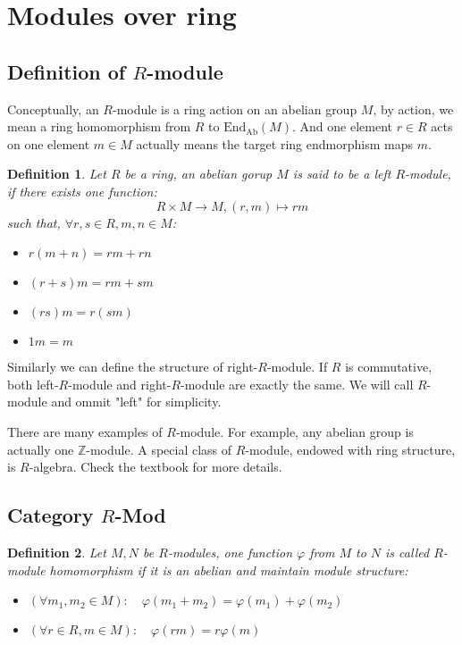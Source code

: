 \documentclass[a4paper, pdf, 11.5pt]{article}
\newtheorem{definition}{Definition}
\begin{document}
\section{Modules over ring}
\subsection{Definition of $R$-module}
Conceptually, an $R$-module is a ring action on an abelian group $M$, by action, we mean
a ring homomorphism from $R$ to $\mbox{End}_{\mbox{Ab}}(M)$. And one element $r\in R$ acts 
on one element $m\in M$ actually means the target ring endmorphism maps $m$.

\begin{definition}
  Let $R$ be a ring, an abelian gorup $M$ is said to be a left $R$-module, if there exists 
  one function:
  $$
  R\times M\rightarrow M, (r, m)\mapsto rm
  $$  such that, $\forall r, s\in R, m,n\in M$:
  \begin{itemize}[leftmargin=0.7cm]
    \item $r(m+n) = rm+rn$
    \item $(r+s)m = rm + sm$
    \item $(rs)m = r(sm)$
    \item $1m = m$
  \end{itemize}
\end{definition}

Similarly we can define the structure of right-$R$-module. If $R$ is commutative, both left-$R$-module
and right-$R$-module are exactly the same. We will call $R$-module and ommit "left" for simplicity.

There are many examples of $R$-module. For example, any abelian group is actually one $\mathbb{Z}$-module. 
A special class of $R$-module, endowed with ring structure, is $R$-algebra. Check the textbook for more 
details.

\subsection{Category $R$-\mbox{Mod}}
\begin{definition}
  Let $M, N$ be $R$-modules, one function $\varphi$ from $M$ to $N$ is called $R$-module homomorphism if it is
  an abelian and maintain module structure: 
  \begin{itemize}[leftmargin=0.7cm]
    \item $(\forall m_1,m_2\in M):\quad \varphi(m_1+m_2) = \varphi(m_1) + \varphi(m_2)$
    \item $(\forall r\in R, m\in M):\quad \varphi(rm)=r\varphi(m)$
  \end{itemize}
\end{definition}
\end{document}
